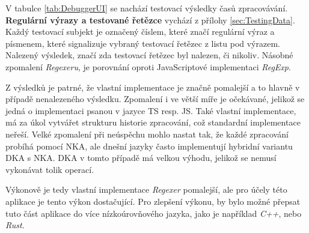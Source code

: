 V tabulce \ref{tab:DebuggerUI} se nachází testovací výsledky časů zpracovávání.
\textbf{Regulární výrazy a testované řetězce} vychází z přílohy \ref{sec:TestingData}. 
Každý testovací subjekt je označený číslem, které značí regulární výraz a písmenem, které signalizuje vybraný testovací řetězec z listu pod výrazem.
Nalezený výsledek, značí zda testovací řetězec byl nalezen, či nikoliv. 
Násobné zpomalení \textit{Regexeru}, je porovnání oproti JavaScriptové implementaci \textit{RegExp}.

Z výsledků je patrné, že vlastní implementace je značně pomalejší a to hlavně v případě nenalezeného výsledku.
Zpomalení i ve větší míře je očekávané, jelikož se jedná o implementaci psanou v jazyce TS resp. JS.
Také vlastní implementace, má za úkol vytvářet strukturu historie zpracování, což standardní implementace neřeší.
Velké zpomalení při neúspěchu mohlo nastat tak, že každé zpracování probíhá pomocí NKA, ale dnešní jazyky často implementují hybridní variantu DKA s NKA.
DKA v tomto případě má velkou výhodu, jelikož se nemusí vykonávat tolik operací.

Výkonově je tedy vlastní implementace \textit{Regexer} pomalejší, ale pro účely této aplikace je tento výkon dostačující.
Pro zlepšení výkonu, by bylo možné přepsat tuto část aplikace do více nízkoúrovňového jazyka, jako je například \textit{C++}, nebo \textit{Rust}.
